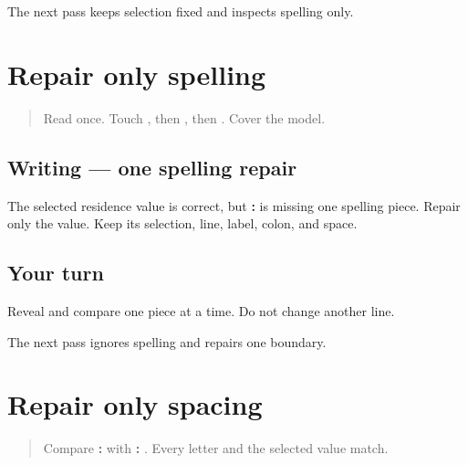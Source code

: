 \begin{tcolorbox}[breakable,colback=teal!4,colframe=teal!35!black,title={Before you move on}]
The next pass keeps selection fixed and inspects spelling only.
\end{tcolorbox}
\section[\texorpdfstring{\pa{ਰਿਹਾਇਸ਼}: \pa{ਸ਼ਹਿਰ} (three-field …)}{ਰਿਹਾਇਸ਼: ਸ਼ਹਿਰ (three-field …)}]{Repair only spelling}

\label{lesson:PA-W06-spelling-repair}



\begin{quote}
Read \textbf{} once. Touch \textbf{}, then \textbf{}, then \textbf{}. Cover the model.
\end{quote}

\subsection*{Writing — one spelling repair}
The selected residence value is correct, but \textbf{: } is missing one spelling piece. Repair only the value. Keep its selection, line, label, colon, and space.

\subsection*{Your turn}
Reveal \textbf{} and compare one piece at a time. Do not change another line.

\begin{tcolorbox}[breakable,colback=teal!4,colframe=teal!35!black,title={Before you move on}]
The next pass ignores spelling and repairs one boundary.
\end{tcolorbox}
\section[\texorpdfstring{\pa{ਕੰਮ}: \pa{ਖੇਤੀ} (three-field spacing repair)}{ਕੰਮ: ਖੇਤੀ (three-field spacing repair)}]{Repair only spacing}

\label{lesson:PA-W06-spacing-repair}



\begin{quote}
Compare \textbf{:} with \textbf{: }. Every letter and the selected value match.
\end{quote}

